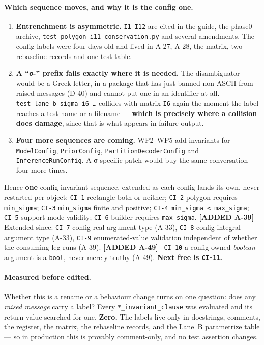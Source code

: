 \documentclass[
  10pt,
]{article}
\providecommand{\tightlist}{%
  \setlength{\itemsep}{0pt}\setlength{\parskip}{0pt}}
\newcommand{\amdnew}[1]{{\color{amdcolor}\footnotesize\textbf{[ADDED #1]}}\ }
\begin{document}
\paragraph{Which sequence moves, and why it is the config one.}
\begin{enumerate}
\tightlist
\item \textbf{Entrenchment is asymmetric.} \texttt{I1}--\texttt{I12} are cited in the guide, the phase0 archive, \texttt{test\_polygon\_i11\_conservation.py} and several amendments. The config labels were four days old and lived in A-27, A-28, the matrix, two rebaseline records and one test table.
\item \textbf{A ``σ-'' prefix fails exactly where it is needed.} The disambiguator would be a Greek letter, in a package that has just banned non-ASCII from raised messages (D-40) and cannot put one in an identifier at all. \texttt{test\_lane\_b\_sigma\_i6\_\ldots{}} collides with matrix \texttt{I6} again the moment the label reaches a test name or a filename --- \textbf{which is precisely where a collision does damage}, since that is what appears in failure output.
\item \textbf{Four more sequences are coming.} WP2--WP5 add invariants for \texttt{ModelConfig}, \texttt{PriorConfig}, \texttt{PartitionDecoderConfig} and \texttt{InferenceRunConfig}. A σ-specific patch would buy the same conversation four more times.
\end{enumerate}
Hence \textbf{one} config-invariant sequence, extended as each config lands its own, never restarted per object: \texttt{CI-1} rectangle both-or-neither; \texttt{CI-2} polygon requires \texttt{min\_sigma}; \texttt{CI-3} \texttt{min\_sigma} finite and positive; \texttt{CI-4} \texttt{min\_sigma < max\_sigma}; \texttt{CI-5} support-mode validity; \texttt{CI-6} builder requires \texttt{max\_sigma}. \amdnew{A-39} Extended since: \texttt{CI-7} config real-argument type (A-33), \texttt{CI-8} config integral-argument type (A-33), \texttt{CI-9} enumerated-value validation independent of whether the consuming leg runs (A-39). \amdnew{A-49} \texttt{CI-10} a config-owned \emph{boolean} argument is a \texttt{bool}, never merely truthy (A-49). \textbf{Next free is \texttt{CI-11}.}

\paragraph{Measured before edited.}
Whether this is a rename or a behaviour change turns on one question: does any \emph{raised message} carry a label? Every \texttt{*\_invariant\_clause} was evaluated and its return value searched for one. \textbf{Zero.} The labels live only in docstrings, comments, the register, the matrix, the rebaseline records, and the Lane~B parametrize table --- so in production this is provably comment-only, and no test assertion changes.
\end{document}
